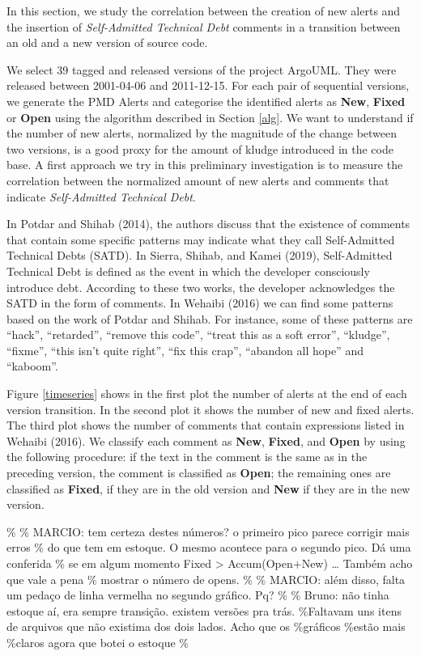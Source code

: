 \documentclass[
]{article}
\begin{document}
In this section, we study the correlation between the creation of new
alerts and the insertion of \textit{Self-Admitted Technical Debt}
comments in a transition between an old and a new version of source
code.

We select 39 tagged and released versions of the project ArgoUML. They
were released between 2001-04-06 and 2011-12-15. For each pair of
sequential versions, we generate the PMD Alerts and categorise the
identified alerts as \textbf{New}, \textbf{Fixed} or \textbf{Open} using
the algorithm described in Section \ref{alg}. We want to understand if
the number of new alerts, normalized by the magnitude of the change
between two versions, is a good proxy for the amount of kludge
introduced in the code base. A first approach we try in this preliminary
investigation is to measure the correlation between the normalized
amount of new alerts and comments that indicate
\textit{Self-Admitted Technical Debt}.

\small

\normalsize

In Potdar and Shihab (2014), the authors discuss that the existence of
comments that contain some specific patterns may indicate what they call
Self-Admitted Technical Debts (SATD). In Sierra, Shihab, and Kamei
(2019), Self-Admitted Technical Debt is defined as the event in which
the developer consciously introduce debt. According to these two works,
the developer acknowledges the SATD in the form of comments. In Wehaibi
(2016) we can find some patterns based on the work of Potdar and Shihab.
For instance, some of these patterns are ``hack'', ``retarded'',
``remove this code'', ``treat this as a soft error'', ``kludge'',
``fixme'', ``this isn't quite right'', ``fix this crap'', ``abandon all
hope'' and ``kaboom''.

Figure \ref{timeseries} shows in the first plot the number of alerts at
the end of each version transition. In the second plot it shows the
number of new and fixed alerts. The third plot shows the number of
comments that contain expressions listed in Wehaibi (2016). We classify
each comment as \textbf{New}, \textbf{Fixed}, and \textbf{Open} by using
the following procedure: if the text in the comment is the same as in
the preceding version, the comment is classified as \textbf{Open}; the
remaining ones are classified as \textbf{Fixed}, if they are in the old
version and \textbf{New} if they are in the new version.

\% \% MARCIO: tem certeza destes números? o primeiro pico parece
corrigir mais erros \% do que tem em estoque. O mesmo acontece para o
segundo pico. Dá uma conferida \% se em algum momento Fixed
\textgreater{} Accum(Open+New) \ldots{} Também acho que vale a pena \%
mostrar o número de opens. \% \% MARCIO: além disso, falta um pedaço de
linha vermelha no segundo gráfico. Pq? \% \% Bruno: não tinha estoque
aí, era sempre transição. existem versões pra trás. \%Faltavam uns itens
de arquivos que não existima dos dois lados. Acho que os \%gráficos
\%estão mais \%claros agora que botei o estoque \%
\end{document}

